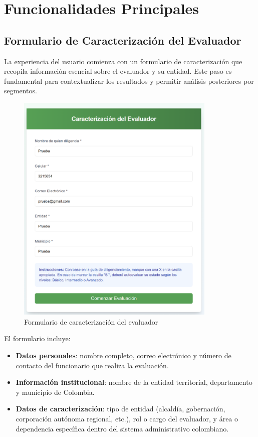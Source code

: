 \documentclass[12pt,a4paper]{report}
\begin{document}
\chapter{Funcionalidades Principales}

\section{Formulario de Caracterización del Evaluador}
La experiencia del usuario comienza con un formulario de caracterización que recopila información esencial sobre el evaluador y su entidad. Este paso es fundamental para contextualizar los resultados y permitir análisis posteriores por segmentos.

\begin{figure}[h]
    \centering
    \includegraphics[width=0.85\textwidth]{Captura de pantalla 2025-06-26 121654.png}
    \caption{Formulario de caracterización del evaluador}
\end{figure}

El formulario incluye:
\begin{itemize}[leftmargin=*]
    \item \textbf{Datos personales}: nombre completo, correo electrónico y número de contacto del funcionario que realiza la evaluación.
    \item \textbf{Información institucional}: nombre de la entidad territorial, departamento y municipio de Colombia.
    \item \textbf{Datos de caracterización}: tipo de entidad (alcaldía, gobernación, corporación autónoma regional, etc.), rol o cargo del evaluador, y área o dependencia específica dentro del sistema administrativo colombiano.
\end{itemize}
\end{document}
